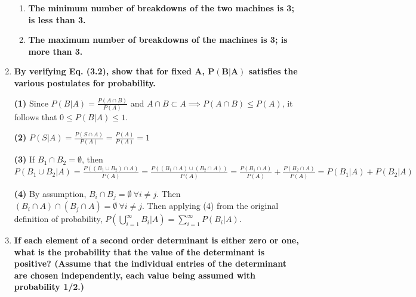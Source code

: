 \documentclass[10pt, oneside]{article}   	%
\theoremstyle{definition}
\begin{document}
\begin{enumerate}[label=3.\arabic*]
\begin{enumerate}
	\item  \begin{tcolorbox}[
	  colback=Cerulean!5!white,
	  colframe=Cerulean!75!black]
	\textbf{The minimum number of breakdowns of the two machines is 3; is less than 3.}
	\end{tcolorbox}
	
	\item  \begin{tcolorbox}[
	  colback=Cerulean!5!white,
	  colframe=Cerulean!75!black]
	\textbf{The maximum number of breakdowns of the machines is 3; is more than 3.}
	\end{tcolorbox}
	\end{enumerate}

\item  \begin{tcolorbox}[
  colback=Cerulean!5!white,
  colframe=Cerulean!75!black]
\textbf{By verifying Eq. (3.2), show that for fixed $\bm{A}$, $\bm{P(B | A)}$ satisfies the various postulates for probability.}
\end{tcolorbox}

\textbf{(1)} Since $P(B | A) = \frac{P(A \cap B)}{P(A)}$ and $A \cap B \subset A \implies P(A \cap B) \leq P(A)$, it follows that $0 \leq P(B | A) \leq 1$.

\textbf{(2)} $P(S | A) = \frac{P(S \cap A)}{P(A)} = \frac{P(A)}{P(A)} = 1$

\textbf{(3)} If $B_1 \cap B_2 = \emptyset$, then $P(B_1 \cup B_2 | A) = \frac{P( (B_1 \cup B_2 ) \cap A)}{P(A)} = \frac{P((B_1 \cap A) \cup (B_2 \cap A))}{P(A)} = \frac{P(B_1 \cap A)}{P(A)} + \frac{P(B_2 \cap A)}{P(A)} = P(B_1 | A) + P(B_2 | A)$

\textbf{(4)} By assumption, $B_i \cap B_j = \emptyset \ \forall i \neq j$. Then $(B_i \cap A) \cap (B_j \cap A) = \emptyset \ \forall i \neq j$. Then applying (4) from the original definition of probability, $P(\bigcup^\infty_{i = 1} B_i | A) = \sum^\infty_{i = 1} P(B_i | A)$.

\item  \begin{tcolorbox}[
  colback=Cerulean!5!white,
  colframe=Cerulean!75!black]
\textbf{If each element of a second order determinant is either zero or one, what is the probability that the value of the determinant is positive? (Assume that the individual entries of the determinant are chosen independently, each value being assumed with probability 1/2.)}
\end{tcolorbox}


\end{enumerate}
\end{document}

